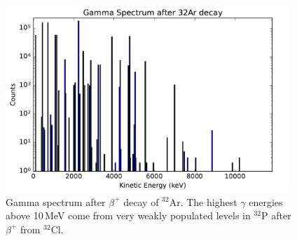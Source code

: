 \documentclass[11pt,a4paper]{article}
\theoremstyle{plain}
\theoremstyle{definition}
\theoremstyle{remark}
\begin{document}
\begin{figure}[h!]
\vspace{-30pt}
\centering
\includegraphics[width=0.95\textwidth]{32Ar_gamma.pdf}
\caption{Gamma spectrum after $\beta^+$ decay of $^{32}$Ar. The highest $\gamma$ energies above 10\,MeV come from very weakly populated levels in $^{32}$P after $\beta^+$ from $^{32}$Cl.}
\label{fig:32Cl_gamma}
\end{figure}
\end{document}
